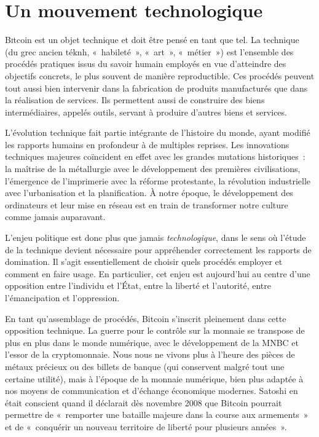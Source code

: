 
\chapter{Un mouvement technologique}
\label{ch:cypherpunks}
\label{enotezch:5}

\vspace{-1em}
\lettrine[]{B}itcoin est un objet technique et doit être pensé en tant que tel. La technique (du grec ancien \foreignlanguage{greek}{téknh}, «~habileté~», «~art~», «~métier~») est l'ensemble des procédés pratiques issus du savoir humain employés en vue d'atteindre des objectifs concrets, le plus souvent de manière reproductible. Ces procédés peuvent tout aussi bien intervenir dans la fabrication de produits manufacturés que dans la réalisation de services. Ils permettent aussi de construire des biens intermédiaires, appelés outils, servant à produire d'autres biens et services.

L'évolution technique fait partie intégrante de l'histoire du monde, ayant modifié les rapports humains en profondeur à de multiples reprises. Les innovations techniques majeures coïncident en effet avec les grandes mutations historiques~: la maîtrise de la métallurgie avec le développement des premières civilisations, l'émergence de l'imprimerie avec la réforme protestante, la révolution industrielle avec l'urbanisation et la planification. À notre époque, le développement des ordinateurs et leur mise en réseau est en train de transformer notre culture comme jamais auparavant.

L'enjeu politique est donc plus que jamais \emph{technologique}, dans le sens où l'étude de la technique devient nécessaire pour appréhender correctement les rapports de domination. Il s'agit essentiellement de choisir quels procédés employer et comment en faire usage.  En particulier, cet enjeu est aujourd'hui au centre d'une opposition entre l'individu et l'État, entre la liberté et l'autorité, entre l'émancipation et l'oppression.

En tant qu'assemblage de procédés, Bitcoin s'inscrit pleinement dans cette opposition technique. La guerre pour le contrôle sur la monnaie se transpose de plus en plus dans le monde numérique, avec le développement de la MNBC et l'essor de la cryptomonnaie. Nous nous ne vivons plus à l'heure des pièces de métaux précieux ou des billets de banque (qui conservent malgré tout une certaine utilité), mais à l'époque de la monnaie numérique, bien plus adaptée à nos moyens de communication et d'échange économique modernes. Satoshi en était conscient quand il déclarait dès novembre 2008 que Bitcoin pourrait permettre de «~remporter une bataille majeure dans la course aux armements~» et de «~conquérir un nouveau territoire de liberté pour plusieurs années~».

